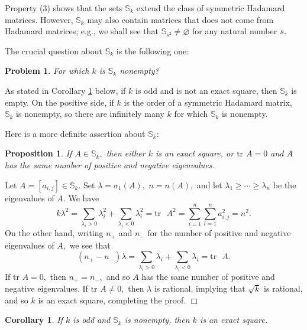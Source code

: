 \documentclass[12pt]{article}%
\newtheorem{corollary}[theorem]{Corollary}
\newtheorem{problem}[theorem]{Problem}
\newtheorem{proposition}[theorem]{Proposition}
\newenvironment{proof}[1][Proof]{\noindent{\textbf {#1}  }}  {\hfill$\Box$\bigskip}
\begin{document}
Property (3) shows that the sets $\mathbb{S}_{k}$ extend the class of
symmetric Hadamard matrices. However, $\mathbb{S}_{k}$ may also contain
matrices that does not come from Hadamard matrices; e.g., we shall see that
$\mathbb{S}_{s^{2}}\neq\varnothing$ for any natural number $s.\medskip$

The crucial question about $\mathbb{S}_{k}$ is the following one:

\begin{problem}
\label{probS}For which $k$ is $\mathbb{S}_{k}$ nonempty?
\end{problem}

As stated in Corollary \ref{cor3} below, if $k$ is odd and is not an exact
square, then $\mathbb{S}_{k}$ is empty. On the positive side, if $k$ is the
order of a symmetric Hadamard matrix, $\mathbb{S}_{k}$ is nonempty, so there
are infinitely many $k$ for which $\mathbb{S}_{k}$ is nonempty.

Here is a more definite assertion about $\mathbb{S}_{k}$:

\begin{proposition}
\label{proq}If $A\in\mathbb{S}_{k},$ then either $k$ is an exact square, or
$\mathrm{tr}$ $A=0$ and $A$ has the same number of positive and negative eigenvalues.
\end{proposition}

\begin{proof}
Let $A=\left[  a_{i,j}\right]  \in\mathbb{S}_{k}.$ Set $\lambda=\sigma
_{1}\left(  A\right)  ,$ $n=n\left(  A\right)  ,$ and let $\lambda_{1}%
\geq\cdots\geq\lambda_{n}$ be the eigenvalues of $A$. We have
\[
k\lambda^{2}=\sum_{\lambda_{i}>0}\lambda_{i}^{2}+\sum_{\lambda_{i}<0}%
\lambda_{i}^{2}=\mathrm{tr}\text{ }A^{2}=\sum_{i=1}^{n}\sum_{l=1}^{n}%
a_{i,j}^{2}=n^{2}.
\]
On the other hand, writing $n_{+}$ and $n_{-}$ for the number of positive and
negative eigenvalues of $A,$ we see that%
\[
\left(  n_{+}-n_{-}\right)  \lambda=\sum_{\lambda_{i}>0}\lambda_{i}%
+\sum_{\lambda_{i}<0}\lambda_{i}=\mathrm{tr}\text{ }A.
\]
If $\mathrm{tr}$ $A=0,$ then $n_{+}=n_{-},$ and so $A$ has the same number of
positive and negative eigenvalues. If $\mathrm{tr}$ $A\neq0,$ then $\lambda$
is rational, implying that $\sqrt{k}$ is rational, and so $k$ is an exact
square, completing the proof.
\end{proof}

\begin{corollary}
\label{cor3}If $k$ is odd and $\mathbb{S}_{k}$ is nonempty, then $k$ is an
exact square.
\end{corollary}
\end{document}
